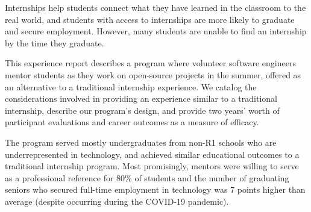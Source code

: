 Internships help students connect what they have learned in the classroom to the real world, and students with access to internships are more likely to graduate and secure employment. However, many students are unable to find an internship by the time they graduate.

This experience report describes a program where volunteer software engineers mentor students as they work on open-source projects in the summer, offered as an alternative to a traditional internship experience. We catalog the considerations involved in providing an experience similar to a traditional internship, describe our program's design, and provide two years' worth of participant evaluations and career outcomes as a measure of efficacy.

The program served mostly undergraduates from non-R1 schools who are underrepresented in technology, and achieved similar educational outcomes to a traditional internship program. Most promisingly, mentors were willing to serve as a professional reference for 80\% of students and the number of graduating seniors who secured full-time employment in technology was 7 points higher than average (despite occurring during the COVID-19 pandemic).